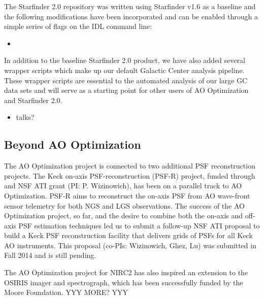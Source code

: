 The Starfinder 2.0 repository was written using Starfinder v1.6 as a
baseline and the following modifications have been incorporated and
can be enabled through a simple series of flags on the IDL command
line:
\begin{itemize}
\item
\end{itemize}
In addition to the baseline Starfinder 2.0 product, we have also
added several wrapper scripts which make up our default Galactic
Center analysis pipeline. These wrapper scripts are essential to the
automated analysis of our large GC data sets and will serve as a
starting point for other users of AO Optimization and Starfinder 2.0.

\begin{itemize}
\item talks? 
\end{itemize}

\subsection{Beyond AO Optimization}

The AO Optimization project is connected to two additional PSF
reconstruction projects. The Keck on-axis PSF-reconstruction (PSF-R)
project, funded through and NSF ATI grant (PI: P. Wizinowich), has
been on a parallel track
to AO Optimization.  PSF-R aims to reconstruct the on-axis PSF from AO
wave-front sensor telemetry for both NGS and LGS observations. 
The success of the AO Optimization project, so far, and the desire to
combine both the on-axis and off-axis PSF estimation techniques led us
to submit a follow-up NSF ATI proposal to build a Keck PSF
reconstruction facility that delivers grids of PSFs for all Keck AO
instruments. This proposal (co-PIs: Wizinowich, Ghez, Lu) was submitted 
in Fall 2014 and is still pending. 

The AO Optimization project for NIRC2 has also inspired an extension
to the OSIRIS imager and spectrograph, which has been successfully
funded by the Moore Foundation. YYY MORE? YYY

